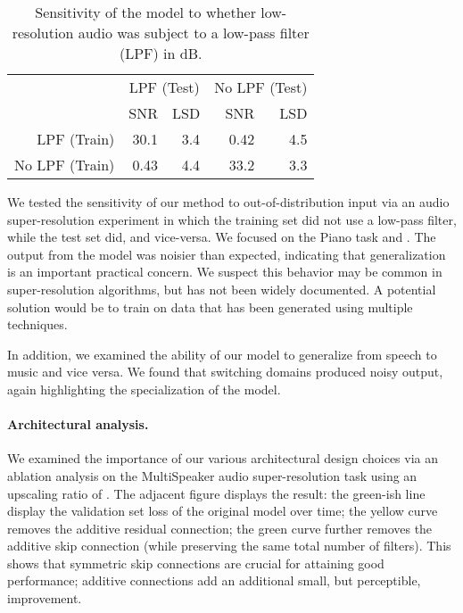 \documentclass{article} \usepackage{iclr2017_workshop,times}
\begin{document}
\begin{wraptable}{r}{0.45\textwidth}
\vspace{-3mm}
\begin{small}
\begin{tabular}{rrrrr}
\hline
 & \multicolumn{2}{c}{LPF {\scriptsize (Test)}} & \multicolumn{2}{c}{No LPF {\scriptsize (Test)}} \\
  & SNR & LSD & SNR & LSD  \\
\hline
LPF {\scriptsize (Train)}  & 30.1 & 3.4 & 0.42 & 4.5   \\
No LPF {\scriptsize (Train)}  & 0.43 & 4.4 & 33.2 & 3.3  \\
\hline
\end{tabular}
\caption{Sensitivity of the model to whether low-resolution audio was subject to a low-pass filter (LPF) in dB.
}\label{scaling}
\vspace{-1mm}
\end{small}
\end{wraptable}

We tested the sensitivity of our method to out-of-distribution input via an audio super-resolution experiment in which the training set did not use a low-pass filter, while the test set did, and vice-versa.
We focused on the {\sc Piano} task and . The output from the model was noisier than expected, indicating that generalization is an important practical concern. 
We suspect this behavior may be common in super-resolution algorithms, but has not been widely documented. A potential solution would be to train on data that has been generated using multiple techniques.

In addition, we examined the ability of our model to generalize from speech to music and vice versa. 
We found that switching domains produced noisy output, again highlighting the specialization of the model.






\paragraph{Architectural analysis.}


We examined the importance of our various architectural design choices via an ablation analysis on the {\sc MultiSpeaker} audio super-resolution task using an upscaling ratio of . The adjacent figure displays the result: the green-ish line display the validation set  loss of the original model over time; the yellow curve removes the additive residual connection; the green curve further removes the additive skip connection (while preserving the same total number of filters). This shows that symmetric skip connections are crucial for attaining good performance; additive connections add an additional small, but perceptible, improvement.
\end{document}
